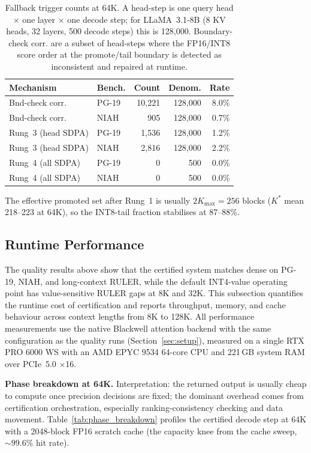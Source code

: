 \documentclass[10pt,twocolumn,a4paper]{article}
\theoremstyle{definition}
\theoremstyle{remark}
\begin{document}
\begin{table}[ht]
\centering
\caption{Fallback trigger counts at 64K.  A head-step is one query head $\times$ one layer $\times$ one decode step; for LLaMA~3.1-8B (8 KV heads, 32 layers, 500 decode steps) this is 128{,}000.  Boundary-check corr. are a subset of head-steps where the FP16/INT8 score order at the promote/tail boundary is detected as inconsistent and repaired at runtime.}
\label{tab:fallback_counts}
\scriptsize
\begin{tabular}{llrrr}
\toprule
\textbf{Mechanism} & \textbf{Bench.} & \textbf{Count} & \textbf{Denom.} & \textbf{Rate} \\
\midrule
Bnd-check corr. & PG-19 & 10{,}221 & 128{,}000 & 8.0\% \\
Bnd-check corr. & NIAH  & 905     & 128{,}000 & 0.7\% \\
Rung~3 (head SDPA) & PG-19 & 1{,}536 & 128{,}000 & 1.2\% \\
Rung~3 (head SDPA) & NIAH  & 2{,}816 & 128{,}000 & 2.2\% \\
Rung~4 (all SDPA)  & PG-19 & 0       & 500       & 0.0\% \\
Rung~4 (all SDPA)  & NIAH  & 0       & 500       & 0.0\% \\
\bottomrule
\end{tabular}
\end{table}  The effective promoted set after Rung~1 is usually $2K_{\max}{=}256$ blocks ($K^*$ mean 218--223 at 64K), so the INT8-tail fraction stabilises at 87--88\%.


\subsection{Runtime Performance}
\label{sec:performance}

The quality results above show that the certified system matches dense on PG-19, NIAH, and long-context RULER, while the default INT4-value operating point has value-sensitive RULER gaps at 8K and 32K.  This subsection quantifies the runtime cost of certification and reports throughput, memory, and cache behaviour across context lengths from 8K to 128K.  All performance measurements use the native Blackwell attention backend with the same configuration as the quality runs (Section~\ref{sec:setup}), measured on a single RTX PRO 6000 WS with an AMD EPYC 9534 64-core CPU and 221\,GB system RAM over PCIe~5.0 $\times$16.

\textbf{Phase breakdown at 64K.}  Interpretation: the returned output is usually cheap to compute once precision decisions are fixed; the dominant overhead comes from certification orchestration, especially ranking-consistency checking and data movement.  Table~\ref{tab:phase_breakdown} profiles the certified decode step at 64K with a 2048-block FP16 scratch cache (the capacity knee from the cache sweep, ${\sim}99.6\%$ hit rate).
\end{document}
